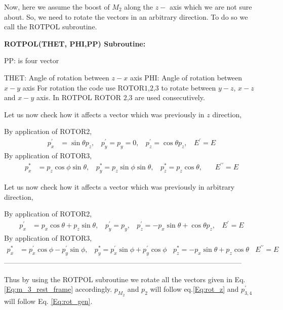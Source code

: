 \documentclass[12pt]{article}
\begin{document}
{{Now, here we assume the boost of $M_2$ along the $z-$ axis which we are not sure about. So, we need to rotate the vectors in an arbitrary direction. To do so we call the $\text{ROTPOL}$ subroutine.

\textbf{ROTPOL(THET, PHI,PP) Subroutine:}

PP: is four vector

THET: Angle of rotation between $z-x$ axis
PHI: Angle of rotation between $x-y$ axis
For rotation the code use $\text{ROTOR1,2,3}$ to rotate between $y-z$, $x-z$ and $x-y$ axis. In ROTPOL $\text{ROTOR 2,3}$ are used consecutively.

Let us now check how it affects a vector which was previously in $z$ direction,

By application of ROTOR2,
\begin{align}
    p_x^\prime &= \sin{\theta} p_z, ~~~~ p_y^\prime = p_y = 0, ~~~~ p_z^\prime = \cos{\theta}p_z, ~~~~ E^\prime = E
\end{align}
By application of ROTOR3,
\begin{align}
\label{Eq:rot_z}
    p_x^{*} &= p_z \cos{\phi}\sin{\theta} , ~~~~ p_y^{*} = p_z \sin{\phi}\sin{\theta}, ~~~~ p_z^{*} = p_z \cos{\theta}, ~~~~ ~~~~ E^{\prime \prime} = E
\end{align}

Let us now check how it affects a vector which was previously in arbitrary direction,

By application of ROTOR2,
\begin{align}
    p_x^\prime &= p_x \cos{\theta} + p_z \sin{\theta} , ~~~~ p_y^\prime = p_y, ~~~~ p_z^\prime = -p_x \sin{\theta} + \cos{\theta}p_z, ~~~~ E^\prime = E
\end{align}
By application of ROTOR3,
\begin{align}
\label{Eq:rot_gen}
    p_x^{*} &= p_x^\prime \cos{\phi} - p_y^\prime \sin{\phi}  , ~~~~ p_y^{*} = p_x^\prime \sin{\phi} + p_y^\prime \cos{\phi}  ~~~~ p_z^{*} = -p_x \sin{\theta} + p_z \cos{\theta} ~~~~ E^{\prime \prime} = E
\end{align}
-----------------------------------------------------------------------------------------------------

Thus by using the ROTPOL subroutine we rotate all the vectors given in Eq.\ref{Eq:m_3_rest_frame} accordingly. $p_{M_2}$ and $p_2$ will follow eq.\ref{Eq:rot_z} and $p_{3,4}^\prime$ will follow Eq. \ref{Eq:rot_gen}.

}}
\end{document}

